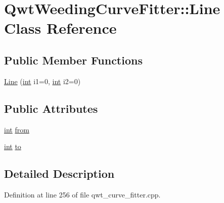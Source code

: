 \hypertarget{class_qwt_weeding_curve_fitter_1_1_line}{\section{Qwt\-Weeding\-Curve\-Fitter\-:\-:Line Class Reference}
\label{class_qwt_weeding_curve_fitter_1_1_line}
}
\subsection*{Public Member Functions}
\begin{DoxyCompactItemize}
\item 
\hyperlink{class_qwt_weeding_curve_fitter_1_1_line_a410ecb419deccac669a37be5f29ddbd2}{Line} (\hyperlink{ioapi_8h_a787fa3cf048117ba7123753c1e74fcd6}{int} i1=0, \hyperlink{ioapi_8h_a787fa3cf048117ba7123753c1e74fcd6}{int} i2=0)
\end{DoxyCompactItemize}
\subsection*{Public Attributes}
\begin{DoxyCompactItemize}
\item 
\hyperlink{ioapi_8h_a787fa3cf048117ba7123753c1e74fcd6}{int} \hyperlink{class_qwt_weeding_curve_fitter_1_1_line_a3f883a1d015a53a1cc4a866ee89c9c1c}{from}
\item 
\hyperlink{ioapi_8h_a787fa3cf048117ba7123753c1e74fcd6}{int} \hyperlink{class_qwt_weeding_curve_fitter_1_1_line_ae9d8ac253185f7c525ab7e2c9df085a7}{to}
\end{DoxyCompactItemize}


\subsection{Detailed Description}


Definition at line 256 of file qwt\-\_\-curve\-\_\-fitter.\-cpp.



